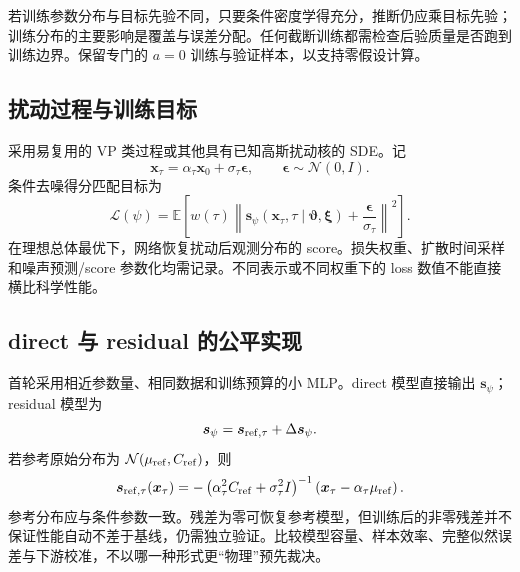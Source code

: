 \documentclass[UTF8,fontset=fandol,a4paper,11pt]{ctexart}
\numberwithin{equation}{section}
\newcommand{\E}{\mathbb E}
\newcommand{\Normal}{\mathcal N}
\newcommand{\btheta}{\boldsymbol\vartheta}
\newcommand{\bxi}{\boldsymbol\xi}
\newcommand{\bs}{\boldsymbol s}
\newcommand{\bx}{\boldsymbol x}
\begin{document}
若训练参数分布与目标先验不同，只要条件密度学得充分，推断仍应乘目标先验；训练分布的主要影响是覆盖与误差分配。任何截断训练都需检查后验质量是否跑到训练边界。保留专门的 $a=0$ 训练与验证样本，以支持零假设计算。

\subsection{扰动过程与训练目标}
采用易复用的 VP 类过程或其他具有已知高斯扰动核的 SDE。记
\begin{equation}
\bx_\tau=\alpha_\tau\bx_0+\sigma_\tau\boldsymbol\epsilon,
\qquad\boldsymbol\epsilon\sim\Normal(0,I).
\end{equation}
条件去噪得分匹配目标为
\begin{equation}
\mathcal L(\psi)=\E\left[
w(\tau)\left\|\bs_\psi(\bx_\tau,\tau\mid\btheta,\bxi)
+\frac{\boldsymbol\epsilon}{\sigma_\tau}\right\|^2\right].
\label{eq:dsm}
\end{equation}
在理想总体最优下，网络恢复扰动后观测分布的 score。损失权重、扩散时间采样和噪声预测/score 参数化均需记录。不同表示或不同权重下的 loss 数值不能直接横比科学性能。

\subsection{direct 与 residual 的公平实现}
首轮采用相近参数量、相同数据和训练预算的小 MLP。direct 模型直接输出 $\bs_\psi$；residual 模型为
\begin{equation}
\bs_\psi=\bs_{{\rm ref},\tau}+\Delta\bs_\psi.
\end{equation}
若参考原始分布为 $\Normal(\mu_{\rm ref},C_{\rm ref})$，则
\begin{equation}
\bs_{{\rm ref},\tau}(\bx_\tau)=
-\left(\alpha_\tau^2C_{\rm ref}+\sigma_\tau^2I\right)^{-1}
\left(\bx_\tau-\alpha_\tau\mu_{\rm ref}\right).
\end{equation}
参考分布应与条件参数一致。残差为零可恢复参考模型，但训练后的非零残差并不保证性能自动不差于基线，仍需独立验证。比较模型容量、样本效率、完整似然误差与下游校准，不以哪一种形式更“物理”预先裁决。
\end{document}

